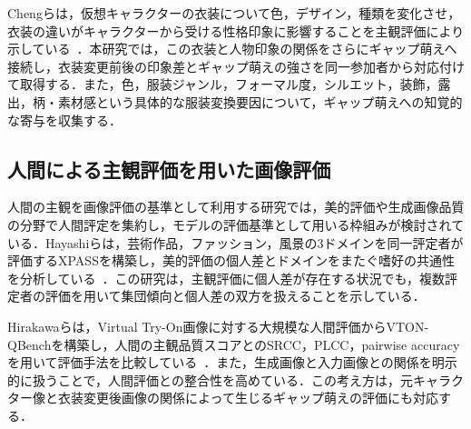 \documentclass[a4j,twocolumn,11pt]{jarticle}
\begin{document}
Chengらは，仮想キャラクターの衣装について色，デザイン，種類を変化させ，衣装の違いがキャラクターから受ける性格印象に影響することを主観評価により示している~\cite{2}．本研究では，この衣装と人物印象の関係をさらにギャップ萌えへ接続し，衣装変更前後の印象差とギャップ萌えの強さを同一参加者から対応付けて取得する．また，色，服装ジャンル，フォーマル度，シルエット，装飾，露出，柄・素材感という具体的な服装変換要因について，ギャップ萌えへの知覚的な寄与を収集する．



\subsection{人間による主観評価を用いた画像評価}
人間の主観を画像評価の基準として利用する研究では，美的評価や生成画像品質の分野で人間評定を集約し，モデルの評価基準として用いる枠組みが検討されている．Hayashiらは，芸術作品，ファッション，風景の3ドメインを同一評定者が評価するXPASSを構築し，美的評価の個人差とドメインをまたぐ嗜好の共通性を分析している~\cite{3}．この研究は，主観評価に個人差が存在する状況でも，複数評定者の評価を用いて集団傾向と個人差の双方を扱えることを示している．




Hirakawaらは，Virtual Try-On画像に対する大規模な人間評価からVTON-QBenchを構築し，人間の主観品質スコアとのSRCC，PLCC，pairwise accuracyを用いて評価手法を比較している~\cite{4}．また，生成画像と入力画像との関係を明示的に扱うことで，人間評価との整合性を高めている．この考え方は，元キャラクター像と衣装変更後画像の関係によって生じるギャップ萌えの評価にも対応する．
\end{document}
